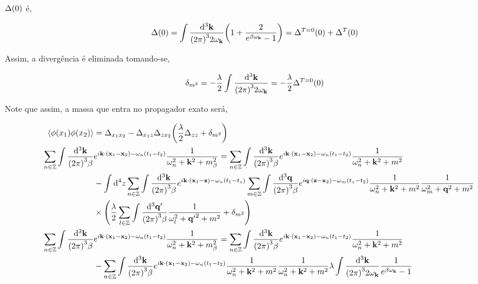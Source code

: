 \documentclass[twoside]{amsart}
\numberwithin{equation}{section}
\begin{document}
$\Delta\qty(0)$ é,

\begin{align}
    \Delta\qty(0)&=\int\frac{\dd[3]{\vb k}}{\qty(2\pi)^32\omega_{\vb k}}\qty(1+\frac{2}{e^{\beta\omega_{\vb k}}-1})=\Delta^{T=0}\qty(0)+\Delta^T\qty(0)
\end{align}

Assim, a divergência é eliminada tomando-se,

\begin{align}
    \delta_{m^2}&=-\frac\lambda2\int\frac{\dd[3]{\vb k}}{\qty(2\pi)^32\omega_{\vb k}}=-\frac\lambda2\Delta^{T=0}\qty(0)
\end{align}

Note que assim, a massa que entra no propagador exato será,

\begin{align}
    \expval{\phi\qty(x_1)\phi\qty(x_2)}&=\Delta_{x_1x_2}-\Delta_{x_1z}\Delta_{zx_2}\qty(\frac\lambda2\Delta_{zz}+\delta_{m^2})\\
    \sum\limits_{n\in\mathbb Z}\int\frac{\dd[3]{\vb k}}{\qty(2\pi)^3\beta}&e^{i\vb k\cdot\qty(\vb x_1-\vb x_2)-\omega_n\qty(t_1-t_2)}\frac{1}{\omega_{n}^2+\vb k^2+m_\beta^2}=\sum\limits_{n\in\mathbb Z}\int\frac{\dd[3]{\vb k}}{\qty(2\pi)^3\beta}e^{i\vb k\cdot\qty(\vb x_1-\vb x_2)-\omega_n\qty(t_1-t_2)}\frac{1}{\omega_n^2+\vb k^2+m^2}\\
    &-\int\dd[4]{z}\sum\limits_{n\in\mathbb Z}\int\frac{\dd[3]{\vb k}}{\qty(2\pi)^3\beta}e^{i\vb k\cdot\qty(\vb x_1-\vb z)-\omega_n\qty(t_1-t_z)}\sum\limits_{m\in\mathbb Z}\int\frac{\dd[3]{\vb q}}{\qty(2\pi)^3\beta}e^{i\vb q\cdot\qty(\vb z-\vb x_2)-\omega_m\qty(t_z-t_2)}\frac{1}{\omega_{n}^2+\vb k^2+m^2}\frac{1}{\omega_{m}^2+{{\vb q}}^2+m^2}\\
    &\times\qty(\frac\lambda2\sum\limits_{l\in\mathbb Z}\int\frac{\dd[3]{\vb q'}}{\qty(2\pi)^3\beta}\frac{1}{\omega_l^2+{{\vb q}'}^2+m^2}+\delta_{m^2})\\
    \sum\limits_{n\in\mathbb Z}\int\frac{\dd[3]{\vb k}}{\qty(2\pi)^3\beta}&e^{i\vb k\cdot\qty(\vb x_1-\vb x_2)-\omega_n\qty(t_1-t_2)}\frac{1}{\omega_{n}^2+\vb k^2+m_\beta^2}=\sum\limits_{n\in\mathbb Z}\int\frac{\dd[3]{\vb k}}{\qty(2\pi)^3\beta}e^{i\vb k\cdot\qty(\vb x_1-\vb x_2)-\omega_n\qty(t_1-t_2)}\frac{1}{\omega_n^2+\vb k^2+m^2}\\
    &-\sum\limits_{n\in\mathbb Z}\int\frac{\dd[3]{\vb k}}{\qty(2\pi)^3\beta}e^{i\vb k\cdot\qty(\vb x_1-\vb x_2)-\omega_n\qty(t_1-t_2)}\frac{1}{\omega_{n}^2+\vb k^2+m^2}\frac{1}{\omega_{n}^2+{{\vb k}}^2+m^2}\lambda\int\frac{\dd[3]{\vb k}}{\qty(2\pi)^32\omega_{\vb k}}\frac{1}{e^{\beta\omega_{\vb k}}-1}\\

\end{align}
\end{document}
